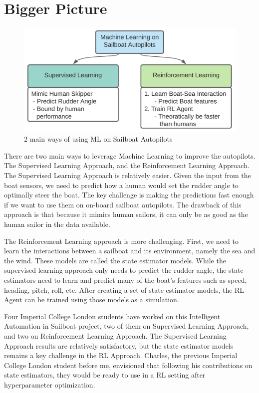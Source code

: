 \documentclass[12pt,twoside]{report}
\begin{document}
\section{Bigger Picture}

\begin{figure}[h]
\centering
\includegraphics[width = 0.8\hsize]{figures/other/ML on autopilots.png}
\caption{2 main ways of using ML on Sailboat Autopilots}
\label{fig:ml-on-autopilot}
\end{figure}

There are two main ways to leverage Machine Learning to improve the autopilots. The Supervised Learning Approach, and the Reinforcement Learning Approach. The Supervised Learning Approach is relatively easier. Given the input from the boat sensors, we need to predict how a human would set the rudder angle to optimally steer the boat. The key challenge is making the predictions fast enough if we want to use them on on-board sailboat autopilots. The drawback of this approach is that because it mimics human sailors, it can only be as good as the human sailor in the data available.

The Reinforcement Learning approach is more challenging. First, we need to learn the interactions between a sailboat and its environment, namely the sea and the wind. These models are called the state estimator models. While the supervised learning approach only needs to predict the rudder angle, the state estimators need to learn and predict many of the boat's features such as speed, heading, pitch, roll, etc. After creating a set of state estimator models, the RL Agent can be trained using those models as a simulation.

Four Imperial College London students have worked on this Intelligent Automation in Sailboat project, two of them on Supervised Learning Approach, and two on Reinforcement Learning Approach. The Supervised Learning Approach results are relatively satisfactory, but the state estimator models remains a key challenge in the RL Approach. Charles, the previous Imperial College London student before me, envisioned that following his contributions on state estimators, they would be ready to use in a RL setting after hyperparameter optimization.
\end{document}
